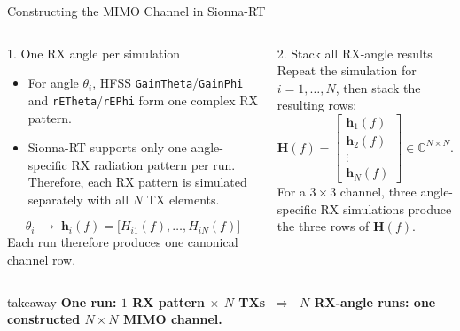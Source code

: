 \begin{frame}{Constructing the MIMO Channel in Sionna-RT}
\scriptsize
\begin{columns}[T,onlytextwidth]
  \begin{block}{1. One RX angle per simulation}
    \begin{itemize}
      \setlength{\itemsep}{0.2em}
      \item For angle $\theta_i$, HFSS
            \texttt{GainTheta}/\texttt{GainPhi} and
            \texttt{rETheta}/\texttt{rEPhi} form one complex RX pattern.
      \item Sionna-RT supports only one angle-specific RX radiation pattern per
            run. Therefore, each RX pattern is simulated separately with all
            $N$ TX elements.
    \end{itemize}
    \[
      \theta_i \;\longrightarrow\;
      \mathbf{h}_i(f)=
      \bigl[H_{i1}(f),\ldots,H_{iN}(f)\bigr]
    \]
    Each run therefore produces one canonical channel row.
  \end{block}

  \begin{block}{2. Stack all RX-angle results}
    Repeat the simulation for $i=1,\ldots,N$, then stack the resulting rows:
    \[
      \mathbf{H}(f)=
      \left[\begin{array}{c}
        \mathbf{h}_1(f)\\[-0.15em]
        \mathbf{h}_2(f)\\[-0.15em]
        \vdots\\[-0.15em]
        \mathbf{h}_N(f)
      \end{array}\right]
      \in\mathbb{C}^{N\times N}.
    \]
    For a $3\!\times\!3$ channel, three angle-specific RX simulations produce
    the three rows of $\mathbf{H}(f)$.
  \end{block}
\end{columns}

\vspace{0.10cm}
\begin{beamercolorbox}[rounded=true,sep=0.8ex,wd=\linewidth]{takeaway}
  \centering
  \textbf{One run: $1$ RX pattern $\times$ $N$ TXs}
  $\;\Longrightarrow\;$
  \textbf{$N$ RX-angle runs: one constructed $N\!\times\!N$ MIMO channel.}
\end{beamercolorbox}
\end{frame}


